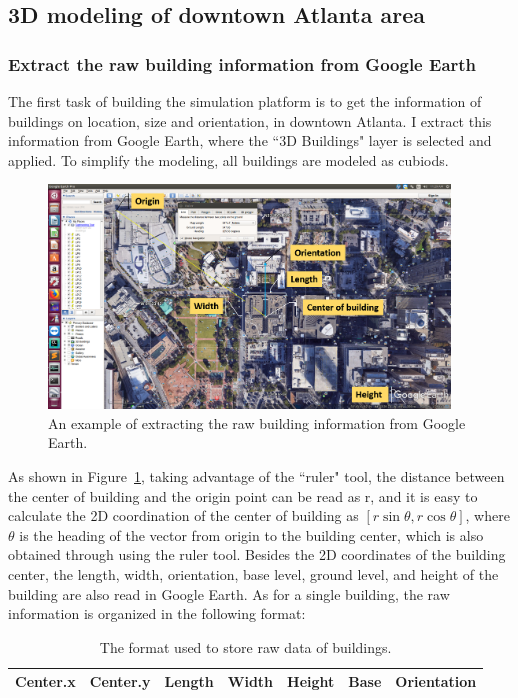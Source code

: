 \documentclass[paper=a4, fontsize=11pt]{scrartcl}
\numberwithin{equation}{section}		%
\numberwithin{figure}{section}			%
\numberwithin{table}{section}				%
\begin{document}
\subsection{3D modeling of downtown Atlanta area}
\subsubsection{Extract the raw building information from Google Earth}
The first task of building the simulation platform is to get the information of buildings on location, size and orientation, in downtown Atlanta. I extract this information from Google Earth, where the ``3D Buildings" layer is selected and applied. To simplify the modeling, all buildings are modeled as cubiods.
\begin{figure}[!ht]
	\centering
	\includegraphics[width=0.95\textwidth]{./Picture2.png}
	\caption{An example of extracting the raw building information from Google Earth.}
	\label{fig: googleearth}
\end{figure}

As shown in Figure~\ref{fig: googleearth}, taking advantage of the ``ruler" tool, the distance between the center of building and the origin point can be read as r, and it is easy to calculate the 2D coordination of the center of building as $[r\sin{\theta}, r\cos{\theta}]$, where $\theta$ is the heading of the vector from origin to the building center, which is also obtained through using the ruler tool. Besides the 2D coordinates of the building center, the length, width, orientation, base level, ground level, and height of the building are also read in Google Earth. As for a single building, the raw information is organized in the following format:
\begin{table}[!ht]
	\centering
	\begin{tabular}{|c|c|c|c|c|c|c|}
		\hline
		Center.x & Center.y  & Length & Width & Height & Base & Orientation \\
		\hline
	\end{tabular}
	\caption{The format used to store raw data of buildings.}
	\label{tab:format}
\end{table}
\end{document}
